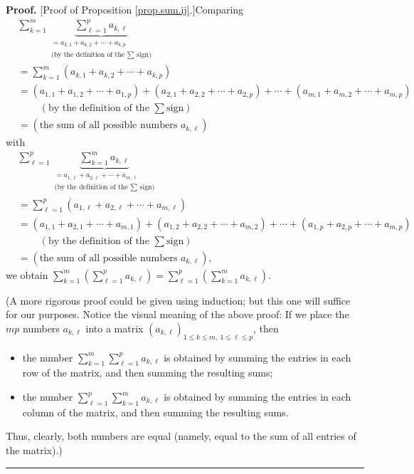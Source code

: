 \documentclass[numbers=enddot,12pt,final,onecolumn,notitlepage]{scrartcl}%
\theoremstyle{definition}
\newenvironment{proof}[1][Proof]{\noindent\textbf{#1.} }{\ \rule{0.5em}{0.5em}}
\let\sumnonlimits\sum
\renewcommand{\sum}{\sumnonlimits\limits}
\begin{document}
\begin{proof}
[Proof of Proposition \ref{prop.sum.ij}.]Comparing%
\begin{align*}
&  \sum_{k=1}^{m}\underbrace{\sum_{\ell=1}^{p}a_{k,\ell}}_{\substack{=a_{k,1}%
+a_{k,2}+\cdots+a_{k,p}\\\text{(by the definition of the }\sum\text{ sign)}%
}}\\
&  =\sum_{k=1}^{m}\left(  a_{k,1}+a_{k,2}+\cdots+a_{k,p}\right) \\
&  =\left(  a_{1,1}+a_{1,2}+\cdots+a_{1,p}\right)  +\left(  a_{2,1}%
+a_{2,2}+\cdots+a_{2,p}\right)  +\cdots+\left(  a_{m,1}+a_{m,2}+\cdots
+a_{m,p}\right) \\
&  \ \ \ \ \ \ \ \ \ \ \left(  \text{by the definition of the }\sum\text{
sign}\right) \\
&  =\left(  \text{the sum of all possible numbers }a_{k,\ell}\right)
\end{align*}
with%
\begin{align*}
&  \sum_{\ell=1}^{p}\underbrace{\sum_{k=1}^{m}a_{k,\ell}}%
_{\substack{=a_{1,\ell}+a_{2,\ell}+\cdots+a_{m,\ell}\\\text{(by the definition
of the }\sum\text{ sign)}}}\\
&  =\sum_{\ell=1}^{p}\left(  a_{1,\ell}+a_{2,\ell}+\cdots+a_{m,\ell}\right) \\
&  =\left(  a_{1,1}+a_{2,1}+\cdots+a_{m,1}\right)  +\left(  a_{1,2}%
+a_{2,2}+\cdots+a_{m,2}\right)  +\cdots+\left(  a_{1,p}+a_{2,p}+\cdots
+a_{m,p}\right) \\
&  \ \ \ \ \ \ \ \ \ \ \left(  \text{by the definition of the }\sum\text{
sign}\right) \\
&  =\left(  \text{the sum of all possible numbers }a_{k,\ell}\right)  ,
\end{align*}
we obtain $\sum_{k=1}^{m}\left(  \sum_{\ell=1}^{p}a_{k,\ell}\right)
=\sum_{\ell=1}^{p}\left(  \sum_{k=1}^{m}a_{k,\ell}\right)  $.

(A more rigorous proof could be given using induction; but this one will
suffice for our purposes. Notice the visual meaning of the above proof: If we
place the $mp$ numbers $a_{k,\ell}$ into a matrix $\left(  a_{k,\ell}\right)
_{1\leq k\leq m,\ 1\leq\ell\leq p}$, then

\begin{itemize}
\item the number $\sum_{k=1}^{m}\sum_{\ell=1}^{p}a_{k,\ell}$ is obtained by
summing the entries in each row of the matrix, and then summing the resulting sums;

\item the number $\sum_{\ell=1}^{p}\sum_{k=1}^{m}a_{k,\ell}$ is obtained by
summing the entries in each column of the matrix, and then summing the
resulting sums.
\end{itemize}

Thus, clearly, both numbers are equal (namely, equal to the sum of all entries
of the matrix).)
\end{proof}
\end{document}
